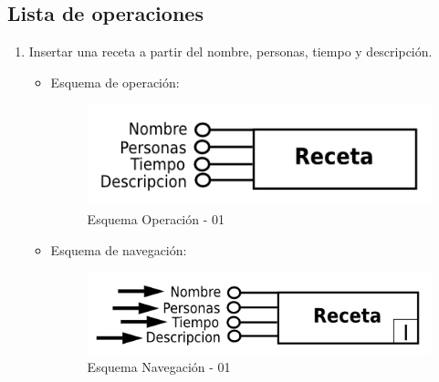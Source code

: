\documentclass[a4paper,12pt]{report}
\begin{document}
\subsection{Lista de operaciones}
\label{sec-7-4-1}
\begin{enumerate}
\item Insertar una receta a partir del nombre, personas, tiempo y
descripción.
\begin{itemize}
\item Esquema de operación:
\begin{figure}[!htp]
\centering
\includegraphics[width=0.9\linewidth]{./operaciones/img/Recetas/01_ope.png}
\caption{Esquema Operación - 01}
\label{fig:ope01}
\medskip
\footnotesize
{}
\end{figure}
\item Esquema de navegación:
\begin{figure}[!htp]
\centering
\includegraphics[width=0.9\linewidth]{./operaciones/img/Recetas/01_nav.png}
\caption{Esquema Navegación - 01}
\label{fig:nave01}
\medskip
\footnotesize
{}
\end{figure}
\end{itemize}


\end{enumerate}
\end{document}
